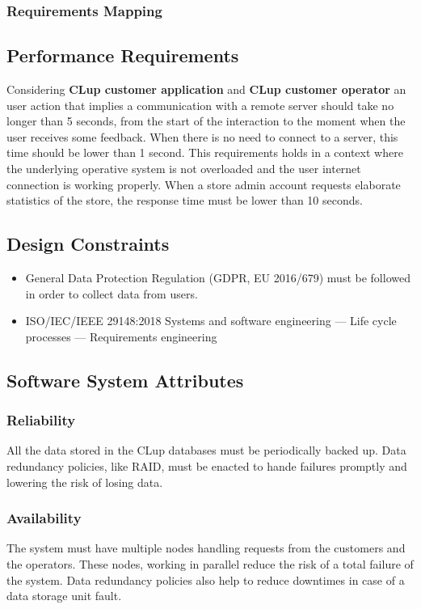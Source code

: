 \subsubsection{Requirements Mapping}
\subsection{Performance Requirements}
Considering \textbf{CLup customer application} and \textbf{CLup customer operator} an user action that implies a communication with a remote server should take no longer than 5 seconds, from the start of the interaction to the moment when the user receives some feedback. When there is no need to connect to a server, this time should be lower than 1 second. This requirements holds in a context where the underlying operative system is not overloaded and the user internet connection is working properly.
\smallskip
When a store admin account requests elaborate statistics of the store, the response time must be lower than 10 seconds.
\subsection{Design Constraints}

\begin{itemize}
    \item General Data Protection Regulation (GDPR, EU 2016/679) must be followed in order to collect data from users.
    \item ISO/IEC/IEEE 29148:2018
          Systems and software engineering — Life cycle processes — Requirements engineering
\end{itemize}

\subsection{Software System Attributes}
\subsubsection{Reliability}
All the data stored in the CLup databases must be periodically backed up. Data redundancy policies, like RAID, must be enacted to hande failures promptly and lowering the risk of losing data.

\subsubsection{Availability}
The system must have multiple nodes handling requests from the customers and the operators. These nodes, working in parallel reduce the risk of a total failure of the system. Data redundancy policies also help to reduce downtimes in case of a data storage unit fault.

